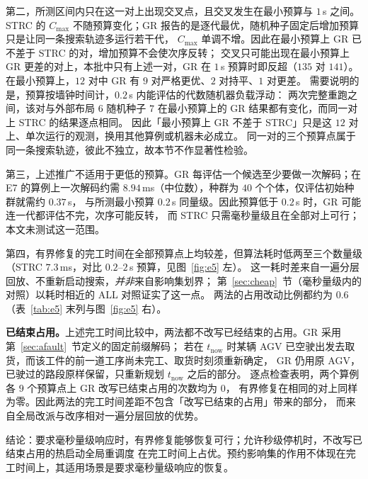 \documentclass[manuscript,screen,review]{acmart}
\providecommand{\STRC}{\textsc{STRC}}
\newcommand{\MsRepairMed}{7.3}
\newcommand{\RzeroPastLo}{0}
\newcommand{\EfiveCells}{12}        %
\newcommand{\EfiveWinMin}{9}       %
\newcommand{\EfiveTieMin}{2}  %
\newcommand{\MsRedecode}{8.94}       %
\begin{document}
第二，所测区间内只在这一对上出现交叉点，且交叉发生在最小预算与 \(1\)\,s 之间。
\STRC{} 的 \(C_{\max}\) 不随预算变化；GR 报告的是逐代最优，随机种子固定后增加预算只是让同一条搜索轨迹多运行若干代，
\(C_{\max}\) 单调不增。因此在最小预算上 GR 已不差于 \STRC{} 的对，增加预算不会使次序反转；
交叉只可能出现在最小预算上 GR 更差的对上，本批中只有上述一对，GR 在 \(1\)\,s 预算时即反超（\(135\) 对 \(141\)）。
在最小预算上，\(\EfiveCells\) 对中 GR 有 \(\EfiveWinMin\) 对严格更优、\(\EfiveTieMin\) 对持平、\(1\) 对更差。
需要说明的是，预算按墙钟时间计，\(0.2\)\,s 内能评估的代数随机器负载浮动：
两次完整重跑之间，该对与外部布局 6 随机种子 \(7\) 在最小预算上的 GR 结果都有变化，而同一对上 \STRC{} 的结果逐点相同。
因此「最小预算上 GR 不差于 \STRC{}」只是这 \(\EfiveCells\) 对上、单次运行的观测，换用其他算例或机器未必成立。
同一对的三个预算点属于同一条搜索轨迹，彼此不独立，故本节不作显著性检验。

第三，上述推广不适用于更低的预算。GR 每评估一个候选至少要做一次解码；在 E7 的算例上一次解码约需
\(\MsRedecode\)\,ms（中位数），种群为 \(40\) 个个体，仅评估初始种群就需约 \(0.37\)\,s，
与所测最小预算 \(0.2\)\,s 同量级。因此预算低于 \(0.2\)\,s 时，GR 可能连一代都评估不完，次序可能反转，
而 \STRC{} 只需毫秒量级且在全部对上可行；本文未测试这一范围。

第四，有界修复的完工时间在全部预算点上均较差，但算法耗时低两至三个数量级
（\STRC{} \(\MsRepairMed\)\,ms，对比 \(0.2\)--\(2\)\,s 预算，见图~\ref{fig:e5} 左）。
这一耗时差来自一遍分层回放、不重新启动搜索，\emph{并非}来自影响集划界；
第~\ref{sec:cheap}~节（毫秒量级内的对照）以耗时相近的 ALL 对照证实了这一点。
两法的占用改动比例都约为 \(0.6\)（表~\ref{tab:e5} 末列与图~\ref{fig:e5} 右）。

\textbf{已结束占用。}上述完工时间比较中，两法都不改写已经结束的占用。GR 采用第~\ref{sec:afault}~节定义的固定前缀解码；
若在 \(t_{\mathrm{now}}\) 时某辆 AGV 已空驶出发去取货，而该工件的前一道工序尚未完工、取货时刻须重新确定，
GR 仍用原 AGV，已驶过的路段原样保留，只重新规划 \(t_{\mathrm{now}}\) 之后的部分。
逐点检查表明，两个算例各 \(9\) 个预算点上 GR 改写已结束占用的次数均为 \(\RzeroPastLo\)，
有界修复在相同的对上同样为零。因此两法的完工时间差距不包含「改写已结束的占用」带来的部分，
而来自全局改派与改序相对一遍分层回放的优势。

结论：要求毫秒量级响应时，有界修复能够恢复可行；允许秒级停机时，不改写已结束占用的热启动全局重调度
在完工时间上占优。预约影响集的作用不体现在完工时间上，其适用场景是要求毫秒量级响应的恢复。

\end{document}
